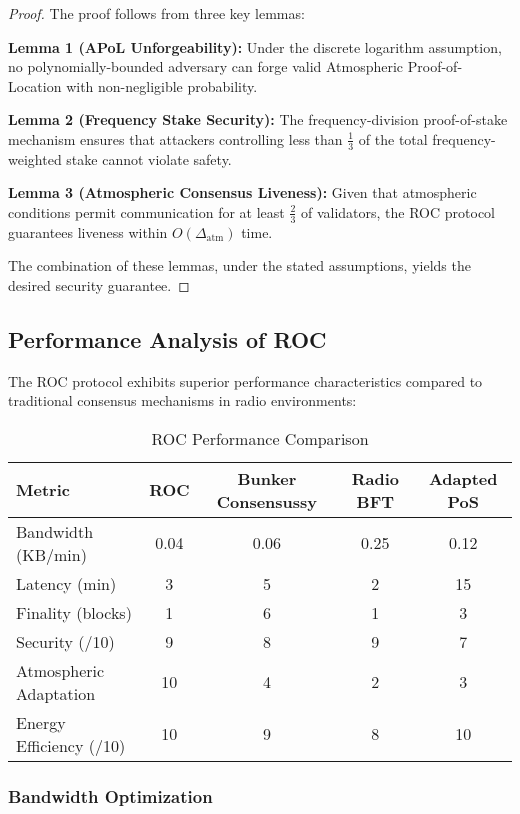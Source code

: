 \documentclass[11pt,a4paper]{article}
\begin{document}
\begin{proof}
The proof follows from three key lemmas:

\textbf{Lemma 1 (APoL Unforgeability):} Under the discrete logarithm assumption, no polynomially-bounded adversary can forge valid Atmospheric Proof-of-Location with non-negligible probability.

\textbf{Lemma 2 (Frequency Stake Security):} The frequency-division proof-of-stake mechanism ensures that attackers controlling less than $\frac{1}{3}$ of the total frequency-weighted stake cannot violate safety.

\textbf{Lemma 3 (Atmospheric Consensus Liveness):} Given that atmospheric conditions permit communication for at least $\frac{2}{3}$ of validators, the ROC protocol guarantees liveness within $O(\Delta_{\text{atm}})$ time.

The combination of these lemmas, under the stated assumptions, yields the desired security guarantee.
\end{proof}

\subsection{Performance Analysis of ROC}

The ROC protocol exhibits superior performance characteristics compared to traditional consensus mechanisms in radio environments:

\begin{table}[h]
\centering
\caption{ROC Performance Comparison}
\begin{tabular}{|l|c|c|c|c|}
\hline
\textbf{Metric} & \textbf{ROC} & \textbf{Bunker Consensussy} & \textbf{Radio BFT} & \textbf{Adapted PoS} \\
\hline
Bandwidth (KB/min) & 0.04 & 0.06 & 0.25 & 0.12 \\
\hline
Latency (min) & 3 & 5 & 2 & 15 \\
\hline
Finality (blocks) & 1 & 6 & 1 & 3 \\
\hline
Security (/10) & 9 & 8 & 9 & 7 \\
\hline
Atmospheric Adaptation & 10 & 4 & 2 & 3 \\
\hline
Energy Efficiency (/10) & 10 & 9 & 8 & 10 \\
\hline
\end{tabular}
\end{table}

\subsubsection{Bandwidth Optimization}
\end{document}
